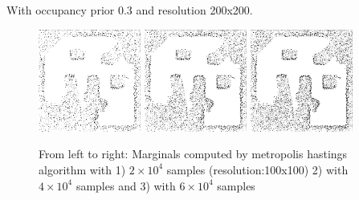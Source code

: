 \documentclass{beamer}
\begin{document}
\begin{frame}
  With occupancy prior 0.3 and resolution 200x200.
  \begin{figure}
    \includegraphics[width=0.3\textwidth]{figures/occgridvis200_200x200.png}
    \includegraphics[width=0.3\textwidth]{figures/occgridvis400_200x200.png}
    \includegraphics[width=0.3\textwidth]{figures/occgridvis600_200x200.png}
    \caption{From left to right: Marginals computed by metropolis hastings algorithm with 1) $2 \times 10^4$ samples (resolution:100x100) 2) with $4 \times 10^4$ samples and 3) with $6 \times 10^4$ samples }
    \label{fig:metropolis-results}
  \end{figure}
\end{frame}
\end{document}

